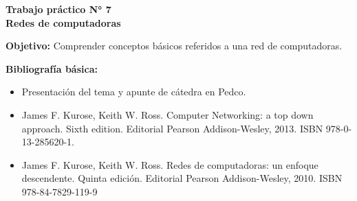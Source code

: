 \documentclass[12pt]{article}
\def\maketitle{

\makeatletter
{\color{bl} \centering \huge \sc \textbf{ Trabajo práctico N° 7\\ \large
\vspace*{-8pt} \color{black} Redes de computadoras \vspace*{8pt} }\par}
\makeatother

\makeatletter


}
\begin{document}
\thispagestyle{empty}
\maketitle
\setlength{\parindent}{1pt}

\textbf{Objetivo:} Comprender conceptos básicos referidos a una red de
computadoras.

\textbf{Bibliografía básica:}

\vspace{-2\topsep}
\begin{itemize}

    \itemsep2pt \parskip0pt 

    \item Presentación del tema y apunte de cátedra en Pedco.

    \item James F. Kurose, Keith W. Ross. Computer Networking: a top down
        approach. Sixth edition. Editorial Pearson Addison-Wesley, 2013.  ISBN
        978-0-13-285620-1.

    \item James F. Kurose, Keith W. Ross. Redes de computadoras: un enfoque
        descendente. Quinta edición. Editorial Pearson Addison-Wesley, 2010.
        ISBN 978-84-7829-119-9

\end{itemize}
\end{document}
